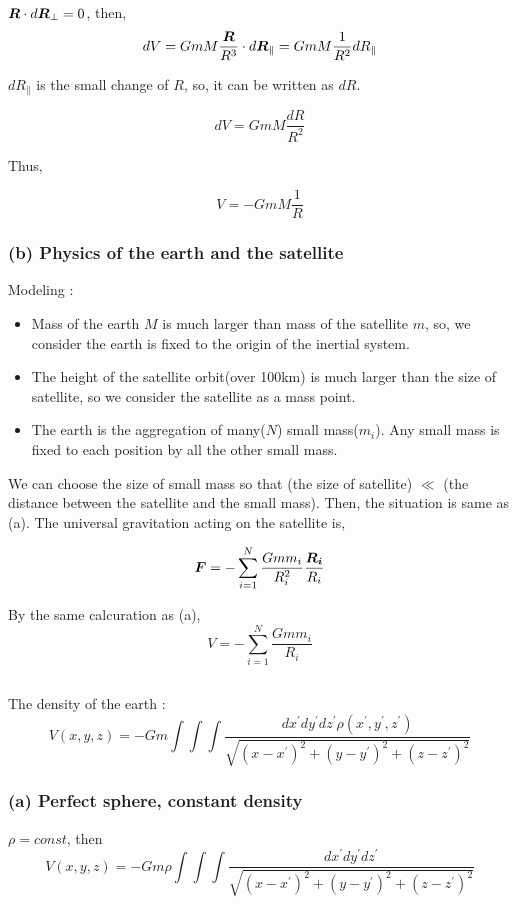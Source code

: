 \documentclass{jarticle}
\newcommand*{\mbold}[1]{\mbox{\boldmath $#1$}}
\newcommand*{\trippleint}{\int\!\!\!\int\!\!\!\int}
\begin{document}
$\mbold{R} \cdot d\mbold{R}_\perp = 0$, then, 
\[
	dV = GmM\frac{\mbold{R}}{R^3} \cdot d\mbold{R}_\parallel = GmM\frac{1}{R^2}dR_\parallel
\]

$dR_\parallel$ is the small change of $R$, so, it can be written as $dR$. 

\[
	dV = GmM\frac{dR}{R^2}
\]

Thus, 

\[
	V = -GmM\frac{1}{R}
\]

\subsubsection*{(b) Physics of the earth and the satellite}

Modeling : 
\begin{itemize}
\item Mass of the earth $M$ is much larger than mass of the satellite $m$, so,  we consider the earth is fixed to the origin of the inertial system. 
\item The height of the satellite orbit(over 100km) is much larger than the size of satellite, so we consider the satellite as a mass point.
\item The earth is the aggregation of many($N$) small mass($m_i$). Any small mass is fixed to each position by all the other small mass.
\end{itemize}

We can choose the size of small mass so that (the size of satellite) $\ll$ (the distance between the satellite and the small mass).
Then, the situation is same as (a). The universal gravitation acting on the satellite is, 

\[
	\mbold{F} = -\sum_{i=1}^N \frac{G m m_i}{R_i^2}\frac{\mbold{R_i}}{R_i}
\]

By the same calcuration as (a), 
\[
	V = -\sum_{i=1}^N \frac{G m m_i}{R_i}
\]

\subsection{}
The density of the earth : 
\begin{equation}
	V(x,y,z) = -Gm \trippleint \frac{dx^\prime dy^\prime dz^\prime \rho(x^\prime, y^\prime, z^\prime)}{\sqrt{(x - x^\prime)^2 + (y - y^\prime)^2 + (z - z^\prime)^2}}
\end{equation}

\subsubsection*{(a) Perfect sphere, constant density}
$\rho = const$, then
\begin{equation}\label{eq:const_dens_potential}
	V(x,y,z) = -Gm\rho \trippleint \frac{dx^\prime dy^\prime dz^\prime}{\sqrt{(x - x^\prime)^2 + (y - y^\prime)^2 + (z - z^\prime)^2}}
\end{equation}
\end{document}
